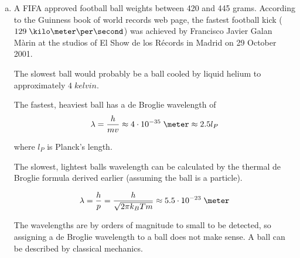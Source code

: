 \documentclass[a4paper,german,12pt,smallheadings]{scrartcl}
\begin{document}
\begin{enumerate}[a)]
  \item
    A FIFA approved football ball weights between 420 and 445 grams. According
    to the Guinness book of world records web page, the fastest football kick
    ($129 \;\kilo\meter\per\second$) was achieved by Francisco Javier Galan
    Màrin at the studios of El Show de los Récords in Madrid on 29 October
    2001.

    The slowest ball would probably be a ball cooled by liquid helium
    to approximately $4 \; kelvin$.

    The fastest, heaviest ball has a de Broglie wavelength of
    \begin{equation*}
      \lambda = \frac{h}{mv} \approx 4 \cdot 10^{-35} \; \meter \approx 2.5 l_P
    \end{equation*}

    where $l_P$ is Planck's length.

    The slowest, lightest balls wavelength can be calculated by the thermal de
    Broglie formula derived earlier (assuming the ball is a particle).

    \begin{equation*}
      \lambda = \frac{h}{p} = \frac{h}{\sqrt{2 \pi k_B T m}} \approx 5.5 \cdot 10^{-23} \; \meter
    \end{equation*}

    The wavelengths are by orders of magnitude to small to be detected, so
    assigning a de Broglie wavelength to a ball does not make sense. A ball can
    be described by classical mechanics.
\end{enumerate}
\end{document}
